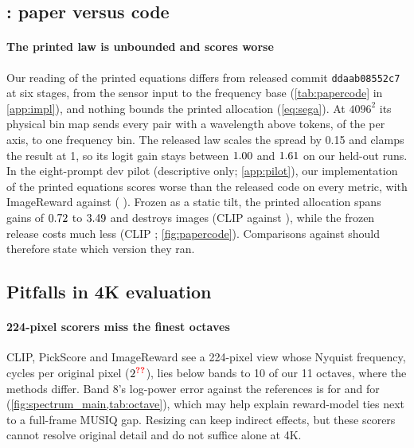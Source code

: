 \subsection{\sega: paper versus code}\label{sec:papercode}

\paragraph{The printed law is unbounded and scores worse}
Our reading of the printed equations differs from released commit \texttt{ddaab08552c7} at six stages, from the sensor input to the frequency base (\cref{tab:papercode} in \cref{app:impl}), and nothing bounds the printed allocation (\cref{eq:sega}). At $4096^2$ its physical bin map sends every pair with a wavelength above  tokens,  of the  per axis, to one frequency bin. The released law scales the spread by 0.15 and clamps the result at 1, so its logit gain stays between $1.00$ and $1.61$ on our held-out runs. In the eight-prompt dev pilot (descriptive only; \cref{app:pilot}), our implementation of the printed equations scores worse than the released code on every metric, with ImageReward  against  ( ). Frozen as a static tilt, the printed allocation spans gains of $0.72$ to $3.49$ and destroys images (CLIP  against ), while the frozen release costs much less (CLIP ; \cref{fig:papercode}). Comparisons against \sega{} should therefore state which version they ran.

\subsection{Pitfalls in 4K evaluation}\label{sec:pitfalls}\label{sec:spectra}\label{sec:checkpoint}

\paragraph{224-pixel scorers miss the finest octaves}
CLIP, PickScore and ImageReward see a 224-pixel view whose Nyquist frequency,  cycles per original pixel ($2^{\N{nyq@log}}$), lies below bands  to 10 of our 11 octaves, where the methods differ. Band 8's log-power error against the references is  for \tempsb{} and  for \segaofficial{} (\cref{fig:spectrum_main,tab:octave}), which may help explain reward-model ties next to a full-frame MUSIQ gap. Resizing can keep indirect effects, but these scorers cannot resolve original detail and do not suffice alone at 4K.

